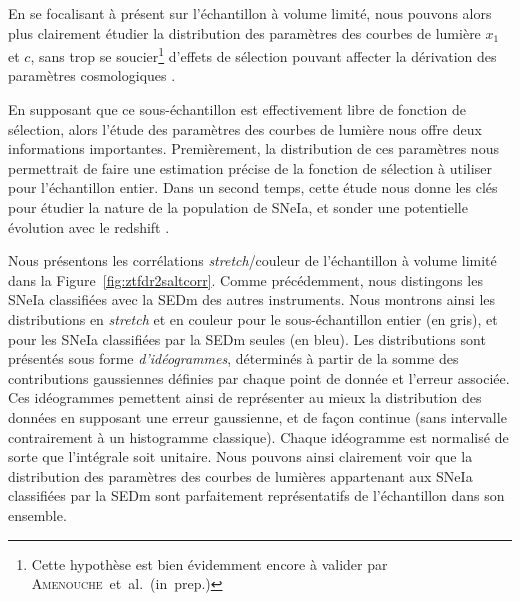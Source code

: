 \documentclass[../main/main.tex]{subfiles}
\begin{document}
En se focalisant à présent sur l'échantillon à volume limité, nous
pouvons alors plus clairement étudier la distribution des paramètres des courbes de
lumière $x_{1}$ et $c$, sans trop se soucier\footnote{Cette hypothèse est bien évidemment encore à
valider par \mbox{\textsc{Amenouche} et al. (in prep.)}} d'effets de sélection pouvant
affecter la dérivation des paramètres cosmologiques
\citep{Scolnicbias2016}.

En supposant que ce sous-échantillon est effectivement libre de fonction
de sélection, alors l'étude des paramètres des courbes de lumière nous
offre deux informations importantes. Premièrement, la distribution
de ces paramètres nous permettrait
de faire une estimation précise de la fonction de sélection à utiliser
pour l'échantillon entier. Dans un second temps, cette étude nous donne les
clés pour étudier la nature de la population de SNeIa, et sonder une potentielle
évolution avec le redshift \citep{NoraNicolas21}.

Nous présentons les corrélations \textit{stretch}/couleur de
l'échantillon à volume limité
dans la Figure~\ref{fig:ztfdr2saltcorr}. Comme précédemment, nous
distingons les SNeIa classifiées avec la SEDm des autres
instruments. Nous montrons ainsi les distributions en \textit{stretch}
et en couleur pour le sous-échantillon entier (en gris), et pour les SNeIa
classifiées par la SEDm seules (en bleu). Les distributions sont
présentés sous forme \textit{d'idéogrammes}, déterminés à partir de la
somme des contributions gaussiennes définies par chaque point de donnée
et l'erreur associée. Ces idéogrammes pemettent ainsi de représenter au
mieux la distribution des données en supposant une erreur gaussienne, et
de façon continue (sans intervalle contrairement à un histogramme
classique). Chaque idéogramme est normalisé de sorte que l'intégrale
soit unitaire. Nous pouvons ainsi clairement voir que la distribution
des paramètres des courbes de lumières appartenant aux SNeIa classifiées
par la SEDm sont parfaitement représentatifs de l'échantillon dans son ensemble. 
\end{document}
